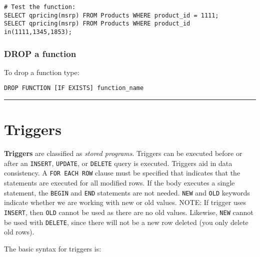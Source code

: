 \documentclass{article}
\begin{document}
\begin{lstlisting}[frame=single]  
# Test the function:
SELECT qpricing(msrp) FROM Products WHERE product_id = 1111;
SELECT qpricing(msrp) FROM Products WHERE product_id in(1111,1345,1853);
\end{lstlisting} 




\subsubsection*{DROP a function}

To drop a function type:  
\begin{lstlisting}[frame=single]  
DROP FUNCTION [IF EXISTS] function_name
\end{lstlisting} 

\hspace{-0.5cm}\rule[-0.101in]{\textwidth}{0.0025in}











\section{Triggers}
 
\textbf{Triggers} are classified as \textit{stored programs}.  Triggers can be executed before or after an \texttt{INSERT}, \texttt{UPDATE}, or \texttt{DELETE} query is executed.  Triggers aid in data consistency.   A \texttt{FOR EACH ROW} clause must be specified that indicates that the statements are executed for all modified rows.  If the body executes a single statement, the \texttt{BEGIN} and \texttt{END} statements are not needed.  \texttt{NEW} and \texttt{OLD} keywords indicate whether we are working with new or old values.  NOTE: If trigger uses \texttt{INSERT}, then \texttt{OLD} cannot be used as there are no old values.  Likewise, \texttt{NEW} cannot be used with \texttt{DELETE}, since there will not be a new row deleted (you only delete old rows).\\

\newpage


\noindent The basic syntax for triggers is:
\end{document}
